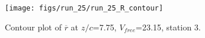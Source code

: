 \begin{figure}[H]
\centering
\texttt{[image: figs/run\_25/run\_25\_R\_contour]}
\caption{Contour plot of $\overline{r}$ at $z/c$=7.75, $V_{free}$=23.15, station 3.}
\label{fig:run_25_R_contour}
\end{figure}


